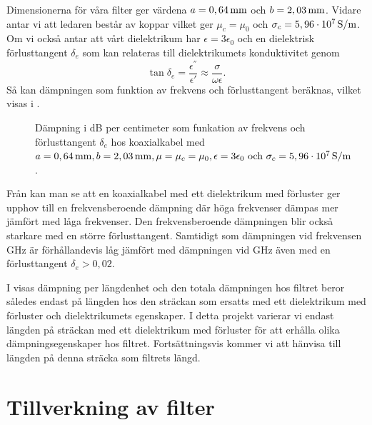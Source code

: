 \documentclass[main.tex]{subfiles}
\begin{document}
Dimensionerna för våra filter ger värdena $a=\unit[0,64]{mm}$ och $b=\unit[2,03]{mm}$. Vidare antar vi att ledaren består av koppar vilket ger $\mu_c=\mu_0$ och $\sigma_c=\unit[5,96\cdot 10^7]{S/m}$. Om vi också antar att vårt dielektrikum har $\epsilon=3\epsilon_0$ och en dielektrisk förlusttangent $\delta_e$ som kan relateras \cite{cheng} till dielektrikumets konduktivitet genom
\begin{equation*}
    \tan\delta_e=\frac{\epsilon^{''}}{\epsilon'}\approx\frac{\sigma}{\omega\epsilon}.
\end{equation*}
Så kan dämpningen som funktion av frekvens och förlusttangent beräknas, vilket visas i .

\begin{figure}[H]
    
        \centering
        \setlength{}
        \setlength\figureheight{12em}
        
  \caption{Dämpning i \unit{dB} per centimeter som funkation av frekvens och förlusttangent $\delta_e$ hos koaxialkabel med $a=\unit[0,64]{mm}, b=\unit[2,03]{mm}, \mu=\mu_c=\mu_0, \epsilon=3\epsilon_0 \text{ och } \sigma_c=\unit[5,96\cdot10^7]{S/m}$.}
  \label{fig:attn_ex}
\end{figure}

Från  kan man se att en koaxialkabel med ett dielektrikum med förluster ger upphov till en frekvensberoende dämpning där höga frekvenser dämpas mer jämfört med låga frekvenser. Den frekvensberoende dämpningen blir också starkare med en större förlusttangent. Samtidigt som dämpningen vid frekvensen \unit[0-8]{GHz} är förhållandevis låg jämfört med dämpningen vid \unit[100]{GHz} även med en förlusttangent $\delta_e>0,02$.

I  visas dämpning per längdenhet och den totala dämpningen hos filtret beror således endast på längden hos den sträckan som ersatts med ett dielektrikum med förluster och dielektrikumets egenskaper. I detta projekt varierar vi endast längden på sträckan med ett dielektrikum med förluster för att erhålla olika dämpningsegenskaper hos filtret. Fortsättningsvis kommer vi att hänvisa till längden på denna sträcka som filtrets längd. 





\section{Tillverkning av filter}
\end{document}
